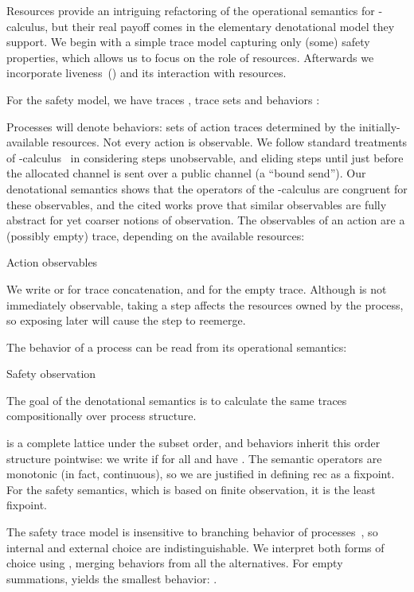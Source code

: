 \documentclass{entcs}
\begin{document}
Resources provide an intriguing refactoring of the operational
semantics for -calculus, but their real payoff comes in the
elementary denotational model they support.  We begin with a simple
trace model capturing only (some) safety properties, which allows us
to focus on the role of resources.  Afterwards we incorporate
liveness~() and its interaction with resources.

For the safety model, we have traces , trace sets  and behaviors
:

Processes will denote behaviors: sets of action traces determined by
the initially-available resources.  Not every action is observable.
We follow standard treatments of
-calculus~\cite{Sangiorgi2001,Hennessy2002} in considering 
steps unobservable, and eliding  steps until just before the
allocated channel  is sent over a public channel (a ``bound
send'').  Our denotational semantics shows that the operators of the
-calculus are congruent for these observables, and the cited
works prove that similar observables are fully abstract for yet
coarser notions of observation.  The observables of an action 
are a (possibly empty) trace, depending on the available resources:
\begin{display}
[]
{Action observables}

\end{display}
We write  or  for trace concatenation, and 
for the empty trace.  Although  is not immediately observable,
taking a  step affects the resources owned by the process, so
exposing  later will cause the  step to reemerge.

The behavior of a process can be read from its operational semantics:
\begin{display}[]{Safety observation}

\end{display}
The goal of the denotational semantics is to calculate the same traces
compositionally over process structure.  

 is a complete lattice under the subset order, and
behaviors inherit this order structure pointwise: we write  if  for all  and have .  The semantic
operators are monotonic (in fact, continuous), so we are justified
in defining \textsf{rec} as a fixpoint.  For the safety semantics,
which is based on finite observation, it is the least fixpoint.

The safety trace model is insensitive to branching behavior of
processes~\cite{Glabbeek1988}, so internal and external choice are
indistinguishable.  We interpret both forms of choice using ,
merging behaviors from all the alternatives.  For empty summations,
 yields the smallest behavior: .
\end{document}
